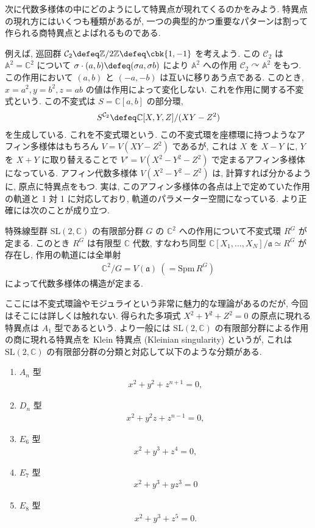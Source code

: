 \documentclass[openany, a4paper, oneside]{jsbook}
\begin{document}
次に代数多様体の中にどのようにして特異点が現れてくるのかをみよう.
特異点の現れ方にはいくつも種類があるが, 一つの典型的かつ重要なパターンは割って作られる商特異点とよばれるものである.

例えば, 巡回群 $\mathcal{C}_2 \defeq \mathbb{Z} / 2\mathbb{Z} \defeq \cbk{1, -1}$ を考えよう.
この $\mathcal{C}_2$ は $\mathbb{A}^2 = \mathbb{C}^2$ について
$\sigma \cdot (a,b) \defeq (\sigma a, \sigma b)$ により $\mathbb{A}^2$ への作用
$\mathcal{C}_2 \curvearrowright \mathbb{A}^2$ をもつ.
この作用において $(a,b)$ と $(-a,-b)$ は互いに移りあう点である.
このとき, $x=a^2, y=b^2, z=ab$ の値は作用によって変化しない.
これを作用に関する不変式という.
この不変式は $S=\mathbb{C}[a,b]$ の部分環,
\begin{align}
 S^{\mathcal{C}_2}
 \defeq
 \mathbb{C}[X,Y,Z]/ (XY-Z^2)
\end{align}
を生成している.
これを不変式環という.
この不変式環を座標環に持つようなアフィン多様体はもちろん $V=V (XY-Z^2)$ であるが,
これは $X$ を $X-Y$ に, $Y$ を $X+Y$ に取り替えることで $V'=V (X^2-Y^2-Z^2)$ で定まるアフィン多様体になっている.
アフィン代数多様体 $V (X^2-Y^2-Z^2)$ は, 計算すれば分かるように, 原点に特異点をもつ.
実は, このアフィン多様体の各点は上で定めていた作用の軌道と 1 対 1 に対応しており, 軌道のパラメーター空間になっている.
より正確には次のことが成り立つ.
\begin{prop}
 特殊線型群 $\mathrm{SL}(2,\mathbb{C})$ の有限部分群 $G$ の $\mathbb{C}^2$ への作用について不変式環 $R^G$ が定まる.
 このとき $R^G$ は有限型 $\mathbb{C}$ 代数,
 すなわち同型 $\mathbb{C}[X_1,\dots,X_N]/\mathfrak{a} \simeq R^G$ が存在し,
 作用の軌道には全単射
 \begin{align}
  \mathbb{C}^2/G
  =
  V (\mathfrak{a}) ~ (= \mathrm{Spm}\,R^G )
 \end{align}
 によって代数多様体の構造が定まる. \fin
\end{prop}
ここには不変式環論やモジュライという非常に魅力的な理論があるのだが, 今回はそこには詳しくは触れない.
得られた多項式 $X^2+Y^2+Z^2=0$ の原点に現れる特異点は $A_1$ 型であるという.
より一般には $\mathrm{SL}(2,\mathbb{C})$ の有限部分群による作用の商に現れる特異点を
Klein 特異点 (Kleinian singularity) というが,
これは $\mathrm{SL}(2,\mathbb{C})$ の有限部分群の分類と対応して以下のような分類がある.
\begin{enumerate}
\item $A_n$ 型
\begin{align}
 x^2 + y^2 + z^{n+1} = 0,
\end{align}
\item $D_n$ 型
\begin{align}
 x^2 + y^2z + z^{n-1} = 0,
\end{align}
\item $E_6$ 型
\begin{align}
 x^2+y^3+z^4=0,
\end{align}
\item $E_7$ 型
\begin{align}
 x^2+y^3+yz^3=0
\end{align}
\item $E_8$ 型
\begin{align}
 x^2+y^3+z^5=0.
\end{align}
\end{enumerate}
\end{document}
